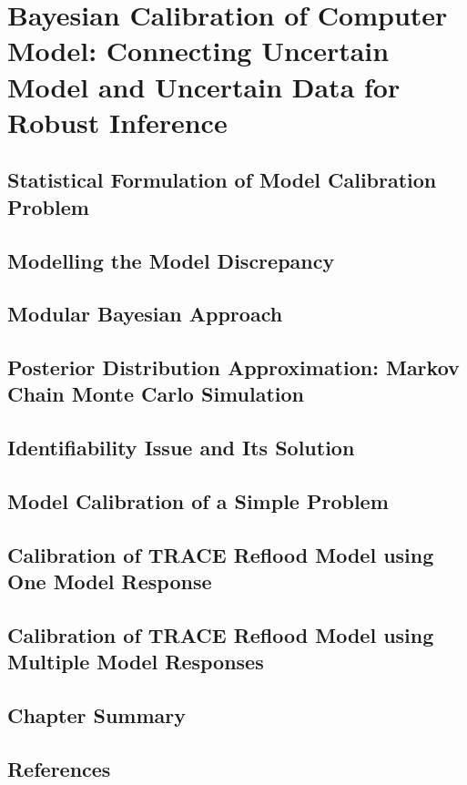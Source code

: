 \chapter{Bayesian Calibration of Computer Model: Connecting Uncertain Model and Uncertain Data for Robust Inference}
\label{ch:introductions}

\section{Statistical Formulation of Model Calibration Problem}

\section{Modelling the Model Discrepancy}

\section{Modular Bayesian Approach}

\section{Posterior Distribution Approximation: Markov Chain Monte Carlo Simulation}

\section{Identifiability Issue and Its Solution}

\section{Model Calibration of a Simple Problem}

\section{Calibration of TRACE Reflood Model using One Model Response}

\section{Calibration of TRACE Reflood Model using Multiple Model Responses}

\section{Chapter Summary}

\section{References}
